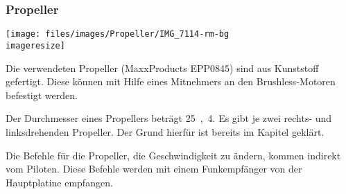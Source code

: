 \subsubsection{Propeller}
\begin{figurewrapper}
	\texttt{[image: files/images/Propeller/IMG\_7114-rm-bg\\imageresize]}
\end{figurewrapper}

Die verwendeten Propeller (MaxxProducts EPP0845) sind aus Kunststoff gefertigt.
Diese können mit Hilfe eines Mitnehmers an den Brushless-Motoren befestigt werden.

Der Durchmesser eines Propellers beträgt \unit{25,4}{\centi\metre}.
Es gibt je zwei rechts- und linksdrehenden Propeller.
Der Grund hierfür ist bereits im Kapitel
 geklärt.

\bigskip

Die Befehle für die Propeller, die Geschwindigkeit zu ändern, kommen
indirekt vom Piloten. Diese Befehle werden mit einem Funkempfänger
von der Hauptplatine empfangen.
